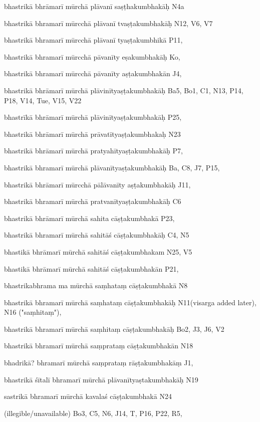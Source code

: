 \begin{ekdosis}
\begin{marma}[hp01_055]
\begin{marma}[hp02_009]
\begin{marma}[hp02_011]
\begin{marma}[hp02_44cd]
\item[bhastrikā bhrāmarī mūrchā plāvanī saṣṭhakumbhakāḥ] N4a
\item[bhastrikā bhramarī mūrcchā plāvanī tvaṣṭakumbhakāḥ] N12, V6, V7
\item[bhastrikā bhramarī mūrcchā plāvanī tyaṣṭakumbhikā] P11, 
\item[bhastrikā bhramarī mūrcchā pāvanīty eṣakumbhakāḥ] Ko,
\item[bhastrikā bhramarī mūrcchā pāvanīty aṣṭakumbhakān] J4,
\item[bhastrikā bhrāmarī mūrchā plāvinītyaṣṭakumbhakāḥ] Ba5, Bo1, C1, N13, P14, P18, V14, Tue, V15, V22
\item[bhastrīkā bhrāmarī mūrchā plāvinītyaṣṭakumbhakāḥ] P25,
\item[bhastrikā bhrāmarī mūrchā prāvatītyaṣṭakumbhakaḥ] N23
\item[bhastrikā bhrāmarī mūrchā pratyahītyaṣṭakumbhakāḥ] P7,  
\item[bhastrikā bhramarī mūrchā plāvanītyaṣṭakumbhakāḥ] Ba, C8, J7, P15,  
\item[bhastrikā bhrāmarī mūrcchā pālāvanīty aṣṭakumbhakāḥ] J11,
\item[bhastrikā bhramarī mūrchā pratvanītyaṣṭakumbhakāḥ] C6
\item[bhastrikā bhrāmarī mūrchā sahita cāṣṭakumbhakā] P23,
\item[bhastrikā bhramarī mūrchā sahitāś cāṣṭakumbhakāḥ] C4, N5
\item[bhastikā bhrāmarī mūrchā sahitāś cāṣṭakumbhakam] N25, V5
\item[bhastikā bhrāmarī mūrchā sahitāś cāṣṭakumbhakān] P21, 
\item[bhastrikabhrama ma mūrchā saṃhataṃ cāṣṭakumbhakā] N8
\item[bhastrikā bhramarī mūrchā saṃhataṃ cāṣṭakumbhakāḥ] N11(visarga added later), N16 ("saṃhitaṃ"),
\item[bhastrikā bhramarī mūrchā saṃhitaṃ cāṣṭakumbhakāḥ] Bo2, J3, J6, V2
\item[bhastrikā bhramarī mūrchā saṃprataṃ cāṣṭakumbhakān] N18
\item[bhadrikā? bhramarī mūrchā saṃprataṃ rāṣṭakumbhakāṃ] J1,
\item[bhastrikā śītalī bhramarī mūrchā plāvanītyaṣtakumbhakāḥ] N19 
\item[sastrikā bhramarī mūrchā kavalaś cāṣṭakumbhakā] N24
\item[(illegible/unavailable)] Bo3, C5, N6, J14, T, P16, P22, R5,
  \begin{description}


\end{description}
\end{marma}
\end{marma}
\end{marma}
\end{marma}
\end{ekdosis}
